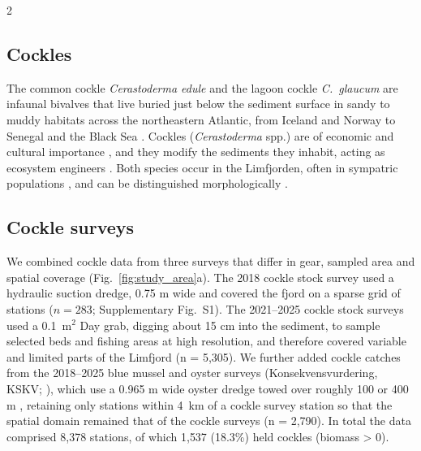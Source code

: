 \begin{spacing}{2}
\subsection{Cockles}
The common cockle \textit{Cerastoderma edule} and the lagoon cockle
\textit{C.~glaucum} are infaunal bivalves that live buried just below the sediment surface in sandy to muddy habitats across the northeastern Atlantic, from Iceland and Norway to Senegal and the Black Sea \citep{Dabouineau2011,
malhamReviewBiologyEuropean2012}. Cockles (\textit{Cerastoderma} spp.) are of
economic and cultural importance \citep[e.g.][]{carssEcosystemServicesProvided2020}, and they modify the sediments they inhabit, acting as ecosystem engineers \citep[e.g.][]{donadiMultiscaleHabitatModification2015}. Both species occur in the
Limfjorden, often in sympatric populations \citep{brockGeographicalDistributionCerastoderma1980,
ivellQUANTITATIVESTUDYCERASTODERMA1981, Freitas2024}, and can be distinguished
morphologically \citep{Parada2018}.

\subsection{Cockle surveys}\label{sec:surveys}

We combined cockle data from three surveys that differ in gear, sampled area and spatial coverage (Fig.~\ref{fig:study_area}a). The 2018 cockle stock survey used a hydraulic suction dredge, 0.75 m wide and covered the fjord on a sparse grid of stations \citep{freitasSustainableCockleFishery2023} ($n = 283$; Supplementary Fig.~S1). The 2021--2025 cockle stock surveys used a 0.1~m$^2$ Day grab, digging about 15 cm into the sediment, to sample selected beds and fishing areas at high resolution, and therefore covered variable and limited parts of the Limfjord \citep{Freitas2021, Freitas2022, freitasSustainableCockleFishery2023, Freitas2023b,
Freitas2024b, Freitas2025} (n = 5{,}305). We further added cockle catches from the 2018--2025 blue mussel and oyster surveys (Konsekvensvurdering, KSKV;
\citealp{nielsenFlatOysterFishery2019}), which use a 0.965 m wide oyster dredge towed over roughly 100 or 400 m , retaining only stations within 4~km of a
cockle survey station so that the spatial domain remained that of the cockle surveys (n = 2{,}790). In total the data
comprised 8{,}378 stations, of which 1{,}537 (18.3\%) held cockles (biomass > 0).


\end{spacing}
